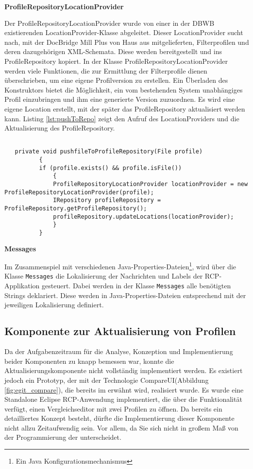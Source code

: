 {{{{\textbf{ProfileRepositoryLocationProvider}{

Der ProfileRepositoryLocationProvider wurde von einer in der \ac{DBWB} existierenden LocationProvider-Klasse abgeleitet. Dieser LocationProvider sucht nach, mit der DocBridge Mill Plus von Haus aus mitgelieferten, Filterprofilen und deren dazugehörigen XML-Schemata. Diese werden bereitgestellt und ins ProfileRepository kopiert. In der Klasse ProfileRepositoryLocationProvider werden viele Funktionen, die zur Ermittlung der Filterprofile dienen überschrieben, um eine eigene Profilversion zu erstellen. Ein Überladen des Konstruktors bietet die Möglichkeit, ein vom bestehenden System unabhängiges Profil einzubringen und ihm eine generierte Version zuzuordnen. Es wird eine eigene Location erstellt, mit der später das ProfileRepository aktualisiert werden kann. Listing \ref{lst:pushToRepo} zeigt den Aufruf des LocationProviders und die Aktualisierung des ProfileRepository.

 \begin{lstlisting}[caption={Methode, um Filterprofil im ProfileRepository abzulegen},label=lst:pushToRepo]
   
   private void pushfileToProfileRepository(File profile)
          {
          if (profile.exists() && profile.isFile())
              {
              ProfileRepositoryLocationProvider locationProvider = new ProfileRepositoryLocationProvider(profile);
              IRepository profileRepository = ProfileRepository.getProfileRepository();
              profileRepository.updateLocations(locationProvider);
              }
          }
 \end{lstlisting}


}
\textbf{Messages}{

Im Zusammenspiel mit verschiedenen Java-Properties-Dateien\footnote{Ein Java Konfigurationsmechanismus}, wird über die Klasse \texttt{Messages} die Lokalisierung der Nachrichten und Labels der \ac{RCP}-Applikation gesteuert. Dabei werden in der Klasse \texttt{Messages} alle benötigten \glspl{String} deklariert. Diese werden in Java-Properties-Dateien entsprechend mit der jeweiligen Lokalisierung definiert.

}

\subsection{Komponente zur Aktualisierung von Profilen}{
\label{sec:impl_aktualisieren}
Da der Aufgabenzeitraum für die Analyse, Konzeption und Implementierung beider Komponenten zu knapp bemessen war, konnte die Aktualisierungskomponente nicht vollständig implementiert werden. Es existiert jedoch ein Prototyp, der mit der Technologie CompareUI(Abbildung \ref{fig:egit_compare}), die bereits im  erwähnt wird, realisiert wurde. Es wurde eine Standalone Eclipse \ac{RCP}-Anwendung implementiert, die über die Funktionalität verfügt, einen Vergleichseditor mit zwei Profilen zu öffnen. Da bereits ein detailliertes Konzept besteht, dürfte die Implementierung dieser Komponente nicht allzu Zeitaufwendig sein. Vor allem, da Sie sich nicht in großem Maß von der Programmierung der  unterscheidet.    

}}}}}
